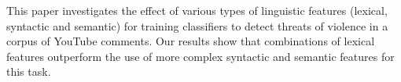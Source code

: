 This paper investigates the effect of various types of linguistic features (lexical, syntactic and semantic) for training classifiers to detect threats of violence in a corpus of YouTube comments. Our results show that combinations of lexical features outperform the use of more complex syntactic and semantic features for this task.
